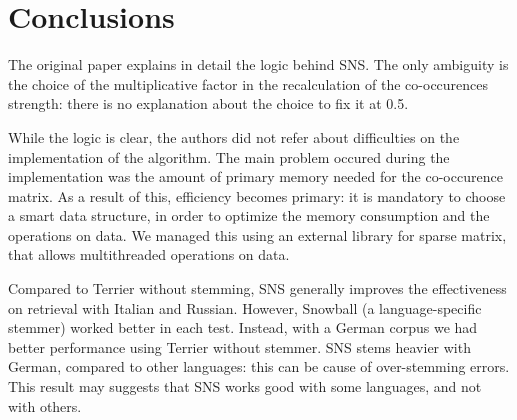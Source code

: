 \section{Conclusions}
The original paper\cite{sns} explains in detail the logic behind SNS. The only ambiguity is the choice of the multiplicative factor in the recalculation of the co-occurences strength: there is no explanation about the choice to fix it at 0.5.

While the logic is clear, the authors did not refer about difficulties on the implementation of the algorithm. The main problem occured during the implementation was the amount of primary memory needed for the co-occurence matrix. As a result of this, efficiency becomes primary: it is mandatory to choose a smart data structure, in order to optimize the memory consumption and the operations on data. We managed this using an external library for sparse matrix, that allows multithreaded operations on data.

Compared to Terrier without stemming, SNS generally improves the effectiveness on retrieval with Italian and Russian. However, Snowball (a language-specific stemmer) worked better in each test. Instead, with a German corpus we had better performance using Terrier without stemmer. SNS stems heavier with German, compared to other languages: this can be cause of over-stemming errors. This result may suggests that SNS works good with some languages, and not with others.  